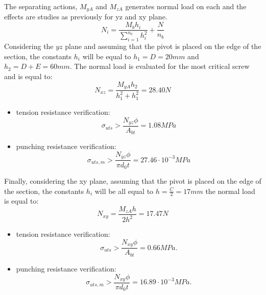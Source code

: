 The separating actions, $M_{yA}$ and $M_{zA}$ generates normal load on each and the effects are studies as previously for yz and xy plane.
\begin{equation*}
    N_{i} = \frac{M_{b}h_{i}}{\sum\limits_{i=1}^{n_{b}} h^2_{i}} + \frac{N}{n_{b}}
\end{equation*}
Considering the $yz$ plane and assuming that the pivot is placed on the edge of the section, the constants $h_{i}$ will be equal to $h_1 = D = 20 mm$ and $h_2 = D + E = 60 mm$.
The normal load is evaluated for the most critical screw and is equal to:
\begin{equation*}
    N_{xz} = \frac{M_{yA}h_{2}}{h_{1}^{2}+h_{1}^{2}} = 28.40 N
\end{equation*}
\begin{itemize}
    \item tension resistance verification:
     \begin{equation*}
       \sigma_{uts} > \frac{N_{yz}\phi}{A_{bt}} = 1.08 MPa
    \end{equation*}
    \item punching resistance verification:
     \begin{equation*}
       \sigma_{uts,m} > \frac{N_{yz}\phi}{\pi d_{0}t} = 27.46 \cdot 10^{-3} MPa
    \end{equation*}
\end{itemize}
Finally, considering the xy plane, assuming that the pivot is placed on the edge of the section, the constants $h_{i}$ will be all equal to $h = \frac{C}{2} = 17 mm$ the normal load is equal to: \\
\begin{equation*}
    N_{xy} = \frac{M_{zA}h}{2h^{2}} = 17.47 N
\end{equation*}
\begin{itemize}
    \item tension resistance verification:
     \begin{equation*}
       \sigma_{uts} > \frac{N_{xy}\phi}{A_{bt}} = 0.66 MPa.
    \end{equation*}
    \item punching resistance verification:
     \begin{equation*}
       \sigma_{uts,m} > \frac{N_{xy}\phi}{\pi d_{0}t} = 16.89 \cdot 10^{-3} MPa.
    \end{equation*}
\end{itemize}

